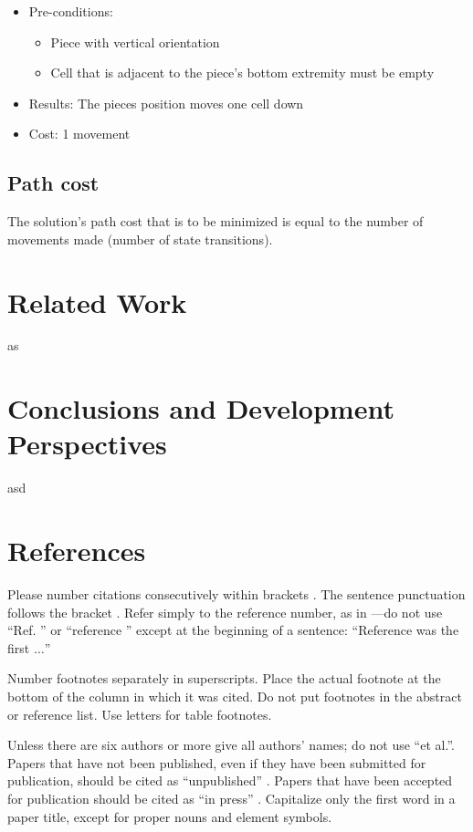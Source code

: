 \documentclass[conference]{IEEEtran}
\begin{document}
\begin{itemize}
    \begin{itemize}
        \item Pre-conditions:
        \begin{itemize}
            \item Piece with vertical orientation
            \item Cell that is adjacent to the piece's bottom extremity must be empty
        \end{itemize}
        \item Results: The pieces position moves one cell down
        \item Cost: 1 movement
    \end{itemize}
\end{itemize}

\subsection{Path cost}
The solution's path cost that is to be minimized is equal to the number of movements made (number of state transitions).


\section{Related Work}
as

\section{Conclusions and Development Perspectives}
asd

\section*{References}

Please number citations consecutively within brackets \cite{b1}. The 
sentence punctuation follows the bracket \cite{b2}. Refer simply to the reference 
number, as in \cite{b3}---do not use ``Ref. \cite{b3}'' or ``reference \cite{b3}'' except at 
the beginning of a sentence: ``Reference \cite{b3} was the first $\ldots$''

Number footnotes separately in superscripts. Place the actual footnote at 
the bottom of the column in which it was cited. Do not put footnotes in the 
abstract or reference list. Use letters for table footnotes.

Unless there are six authors or more give all authors' names; do not use 
``et al.''. Papers that have not been published, even if they have been 
submitted for publication, should be cited as ``unpublished'' \cite{b4}. Papers 
that have been accepted for publication should be cited as ``in press'' \cite{b5}. 
Capitalize only the first word in a paper title, except for proper nouns and 
element symbols.
\end{document}
